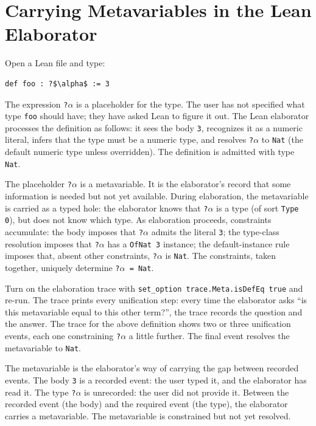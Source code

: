 \section{Carrying Metavariables in the Lean Elaborator}
\label{se:carrying-metavariables}

Open a Lean file and type:
\begin{verbatim}
def foo : ?$\alpha$ := 3
\end{verbatim}
The expression \texttt{?$\alpha$} is a placeholder for the type. The user
has not specified what type \texttt{foo} should have; they have asked Lean
to figure it out. The Lean elaborator processes the definition as follows:
it sees the body \texttt{3}, recognizes it as a numeric literal, infers
that the type must be a numeric type, and resolves \texttt{?$\alpha$} to
\texttt{Nat} (the default numeric type unless overridden). The definition
is admitted with type \texttt{Nat}.

The placeholder \texttt{?$\alpha$} is a metavariable. It is the
elaborator's record that some information is needed but not yet
available. During elaboration, the metavariable is carried as a typed
hole: the elaborator knows that \texttt{?$\alpha$} is a type (of sort
\texttt{Type 0}), but does not know which type. As elaboration proceeds,
constraints accumulate: the body imposes that \texttt{?$\alpha$} admits
the literal \texttt{3}; the type-class resolution imposes that
\texttt{?$\alpha$} has a \texttt{OfNat 3} instance; the default-instance
rule imposes that, absent other constraints, \texttt{?$\alpha$} is
\texttt{Nat}. The constraints, taken together, uniquely determine
\texttt{?$\alpha$ = Nat}.

Turn on the elaboration trace with \texttt{set\_option
trace.Meta.isDefEq true} and re-run. The trace prints every unification
step: every time the elaborator asks ``is this metavariable equal to this
other term?'', the trace records the question and the answer. The trace
for the above definition shows two or three unification events, each one
constraining \texttt{?$\alpha$} a little further. The final event
resolves the metavariable to \texttt{Nat}.

The metavariable is the elaborator's way of carrying the gap between
recorded events. The body \texttt{3} is a recorded event: the user
typed it, and the elaborator has read it. The type \texttt{?$\alpha$} is
unrecorded: the user did not provide it. Between the recorded event
(the body) and the required event (the type), the elaborator carries a
metavariable. The metavariable is constrained but not yet resolved.

